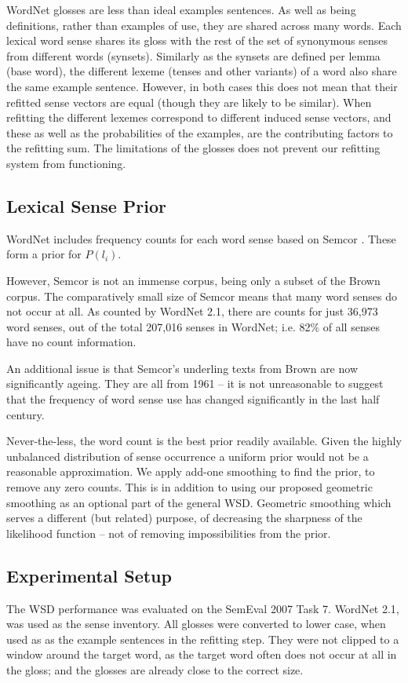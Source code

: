 \documentclass{sig-alternate}
\begin{document}
WordNet glosses are less than ideal examples sentences. As well as being definitions, rather than examples of use, they are shared across many words. Each lexical word sense shares its gloss with the rest of the set of synonymous senses from different words (synsets). Similarly as the synsets are defined per lemma (base word), the different lexeme (tenses and other variants) of a word also share the same example sentence. However, in both cases this does not mean that their refitted sense vectors are equal (though they are likely to be similar). When refitting the different lexemes correspond to different induced sense vectors, and these as well as the probabilities of the examples, are the contributing factors to the refitting sum. The limitations of the glosses does not prevent our refitting system from functioning.

\subsection{Lexical Sense Prior}
WordNet includes frequency counts for each word sense based on Semcor \textcite{tengi1998design}. These form a prior for $P(l_i)$.

However, Semcor is not an immense corpus, being only a subset of the Brown corpus. The comparatively small size of Semcor means that many word senses do not occur at all. As counted by WordNet 2.1, there are counts for just  36,973 word senses, out of the total 207,016 senses in WordNet; i.e. 82\% of all senses have no count information.

An additional issue is that Semcor's underling texts from Brown are now significantly ageing. They are all from 1961 \cite{francis1979brown} -- it is not unreasonable to suggest that the frequency of word sense use has changed significantly in the last half century.

Never-the-less, the word count is the best prior readily available. Given the highly unbalanced distribution of sense occurrence a uniform prior would not be a reasonable approximation.
We apply add-one smoothing to find the prior, to remove any zero counts.
This is in addition to using our proposed geometric smoothing as an optional part of the general WSD.
Geometric smoothing which serves a different (but related) purpose, of decreasing the sharpness of the likelihood function -- not of removing impossibilities from the prior.

\subsection {Experimental Setup}
The WSD performance was evaluated on the SemEval 2007 Task 7. 
WordNet 2.1, was used as the sense inventory.
All glosses were converted to lower case, when used as as the example sentences in the refitting step. They were not clipped to a window around the target word, as the target word often does not occur at all in the gloss; and the glosses are already close to the correct size.
\end{document}
